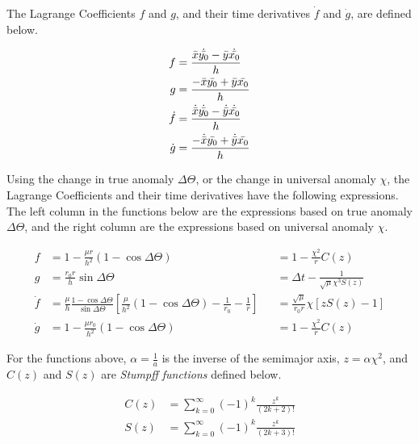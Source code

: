 The Lagrange Coefficients $f$ and $g$, and their time derivatives $\dot{f}$ and $\dot{g}$, are defined below.

\begin{align}
    f &= \frac{ \Bar{x} \dot{\Bar{y_0}} - \Bar{y} \dot{\Bar{x_0}} }{ h }
    \label{eq:lagrange_f} \\
    g &= \frac{ - \Bar{x} \Bar{y_0} + \Bar{y} \Bar{x_0} }{ h } 
    \label{eq:lagrange_g} \\
    \dot{f} &= \frac{ \dot{\Bar{x}} \dot{\Bar{y_0}} - \dot{\Bar{y}} \dot{\Bar{x_0}} }{ h } 
    \label{eq:lagrange_f_dot} \\
    \dot{g} &= \frac{ - \dot{\Bar{x}} \Bar{y_0} + \dot{\Bar{y}} \Bar{x_0} }{ h } 
    \label{eq:lagrange_g_dot}
\end{align}

Using the change in true anomaly $\Delta \Theta$, or the change in universal anomaly $\chi$, the Lagrange Coefficients and their time derivatives have the following expressions. The left column in the functions below are the expressions based on true anomaly $\Delta \Theta$, and the right column are the expressions based on universal anomaly $\chi$.

\begin{align}
    f &= 1 - \frac{ \mu r }{ h^2 } \left( 1 - \cos{\Delta \Theta} \right) &&= 1 - \frac{\chi^2}{r} C\left(z\right)
    \label{eq:lagrange_anomaly_f} \\
    g  &= \frac{ r_0 r }{ h } \sin{\Delta \Theta} &&= \Delta t - \frac{1}{\sqrt{\mu} \chi^3 S\left( z \right)}
    \label{eq:lagrange_anomaly_g} \\
    \dot{f} &= \frac{\mu}{h} \frac{1 - \cos{\Delta \Theta}}{\sin{\Delta \Theta}} \left[ \frac{\mu}{h^2} \left(1 - \cos{\Delta \Theta} \right) - \frac{1}{r_0} - \frac{1}{r} \right] &&= \frac{\sqrt{\mu}}{r_0 r} \chi \left[z S\left( z \right) - 1 \right]
    \label{eq:lagrange_anomaly_f_dot} \\
    \dot{g} &= 1 - \frac{\mu r_0}{h^2} \left(1 - \cos{\Delta \Theta} \right) &&= 1 - \frac{\chi^2}{r} C\left( z \right)
    \label{eq:lagrange_anomaly_g_dot}
\end{align}

For the functions above, $\alpha = \frac{1}{a}$ is the inverse of the semimajor axis, $z = \alpha \chi^2$, and $C(z)$ and $S(z)$ are \textit{Stumpff functions} defined below.

\begin{align}
    C(z) &= \sum_{k = 0}^{\infty} (-1)^k \frac{z^k}{(2k + 2)!} \\
    S(z) &= \sum_{k = 0}^{\infty} (-1)^k \frac{z^k}{(2k + 3)!}
\end{align}{}




